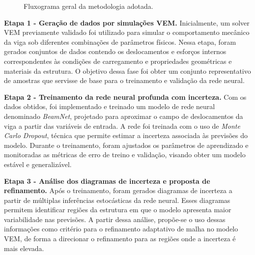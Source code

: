 \documentclass[12pt,openright,oneside,a4paper,english,brazil]{abntex2}
\begin{document}
\begin{figure}[H]
    \centering
    \caption{Fluxograma geral da metodologia adotada.}
    \label{fig:fluxo_metodologia}
\end{figure}

\textbf{Etapa 1 - Geração de dados por simulações VEM.} 
Inicialmente, um solver VEM previamente validado foi utilizado para simular o comportamento mecânico da viga sob diferentes combinações de parâmetros físicos. Nessa etapa, foram gerados 
conjuntos de dados contendo os deslocamentos e esforços internos correspondentes às condições de carregamento e propriedades geométricas e materiais da estrutura. O objetivo dessa fase foi 
obter um conjunto representativo de amostras que servisse de base para o treinamento e validação da rede neural.

\textbf{Etapa 2 - Treinamento da rede neural profunda com incerteza.} 
Com os dados obtidos, foi implementado e treinado um modelo de rede neural denominado \textit{BeamNet}, projetado para aproximar o campo de deslocamentos da viga a partir das variáveis 
de entrada. A rede foi treinada com o uso de \textit{Monte Carlo Dropout}, técnica que permite estimar a incerteza associada às previsões do modelo. Durante o treinamento, foram ajustados 
os parâmetros de aprendizado e monitoradas as métricas de erro de treino e validação, visando obter um modelo estável e generalizável.

\textbf{Etapa 3 - Análise dos diagramas de incerteza e proposta de refinamento.} 
Após o treinamento, foram gerados diagramas de incerteza a partir de múltiplas inferências estocásticas da rede neural. Esses diagramas permitem identificar regiões da estrutura em que o 
modelo apresenta maior variabilidade nas previsões. A partir dessa análise, propõe-se o uso dessas informações como critério para o refinamento adaptativo de malha no modelo VEM, de forma 
a direcionar o refinamento para as regiões onde a incerteza é mais elevada.
\end{document}

